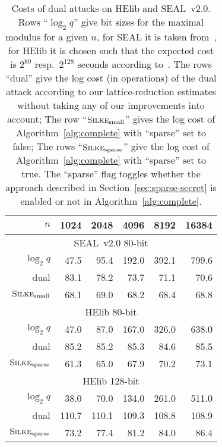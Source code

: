 \documentclass[a4paper]{llncs}
\newcommand{\MYALG}[1][blank]{\ifthenelse{\equal{#1}{blank}}{\textsc{Silke}}{\textsc{Silke}\ensuremath{_{#1}}}\xspace}
\begin{document}
\begin{table}
  \begin{center}
    \begin{tabular}{rrrrrr}
      \(n\) & 1024 & 2048 & 4096 & 8192 & 16384\\
      \midrule
      \multicolumn{6}{c}{SEAL~v2.0 80-bit}\\
      $\log_{2} q$     & 47.5 &   95.4 &  192.0 &  392.1  & 799.6\\
        dual  & 83.1 &   78.2 &   73.7 &   71.1 &   70.6\\
      \(\MYALG_{{\rm small}}\) & 68.1 &   69.0 &   68.2 &   68.4 &   68.8\\
      \midrule
      \multicolumn{6}{c}{HElib 80-bit}\\
      $\log_{2} q$     &  47.0 &   87.0 &  167.0 &  326.0 &  638.0\\
      dual    &  85.2 &   85.2 &   85.3 &   84.6 &   85.5\\
      \(\MYALG_{{\rm sparse}}\)  &  61.3 &   65.0 &   67.9 &   70.2 &   73.1\\
      \midrule
      \multicolumn{6}{c}{HElib 128-bit}\\
      $\log_{2} q$     &   38.0 &   70.0 &  134.0 &  261.0 &  511.0 \\
      dual    &  110.7 &  110.1 &  109.3 &  108.8 &  108.9 \\
      \(\MYALG_{{\rm sparse}}\) &   73.2 &   77.4 &   81.2 &   84.0 &   86.4 \\      
    \end{tabular}
  \end{center}
  \caption{Costs of dual attacks on HElib and SEAL~v2.0. Rows ``$\log_{2} q$'' give bit sizes for the maximal modulus for a given $n$, for SEAL it is taken from~\cite{AFRICACRYPT:LepNae14}, for HElib it is chosen such that the expected cost  is $2^{80}$ resp.\ $2^{128}$ seconds according to~\cite{C:GenHalSma12}. The rows ``dual'' give the log cost (in operations) of the dual attack according to our lattice-reduction estimates without taking any of our improvements into account; The row ``\(\MYALG_{{\rm small}}\)'' gives the log cost of Algorithm~\ref{alg:complete} with ``sparse'' set to false; The rows ``\(\MYALG_{{\rm sparse}}\)'' give the log cost of Algorithm~\ref{alg:complete} with ``sparse'' set to true. The ``sparse'' flag toggles whether the approach described in Section~\ref{sec:sparse-secret} is enabled or not in Algorithm~\ref{alg:complete}.}\label{tab:results}
\end{table}
\end{document}
